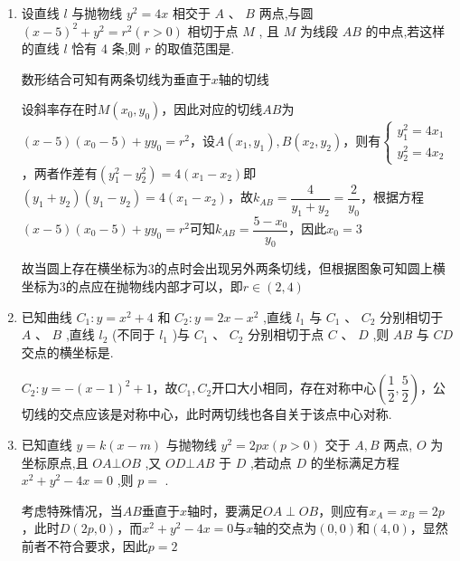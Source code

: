\begin{enumerate}
\begin{jieda}
        综上，$k \in [-\sqrt{3}, -1] \cup [1, \sqrt{3}]$，因此$\alpha \in \left[\dfrac{\pi}{4}, \dfrac{\pi}{3}\right] \cup \left[\dfrac{2\pi}{3}, \dfrac{3\pi}{4}\right]$
    \end{jieda}
    
    \item 设直线 $l$ 与抛物线 ${y}^{2} = {4x}$ 相交于 $A\text{ 、 }B$ 两点,与圆 ${\left( x - 5\right) }^{2} + {y}^{2} = {r}^{2}\left( {r > 0}\right)$ 相切于点 $M$ , 且 $M$ 为线段 ${AB}$ 的中点,若这样的直线 $l$ 恰有 4 条,则 $r$ 的取值范围是.
    \begin{jieda}
        数形结合可知有两条切线为垂直于$x$轴的切线

        设斜率存在时$M(x_0, y_0)$，因此对应的切线$AB$为$(x-5)(x_0 - 5)+yy_0 = r^2$，设$A(x_1, y_1), B(x_2, y_2)$，则有$\left\{\begin{array}{l}
             y_1^2 = 4x_1 \\
             y_2^2 = 4x_2
        \end{array}\right.$，两者作差有$(y_1^2 - y_2^2) = 4(x_1-x_2)$即$(y_1+y_2)(y_1 - y_2) = 4(x_1-x_2)$，故$k_{AB} = \dfrac{4}{y_1+y_2} = \dfrac{2}{y_0}$，根据方程$(x-5)(x_0 - 5)+yy_0 = r^2$可知$k_{AB} = \dfrac{5-x_0}{y_0}$，因此$x_0 = 3$

        故当圆上存在横坐标为$3$的点时会出现另外两条切线，但根据图象可知圆上横坐标为$3$的点应在抛物线内部才可以，即$r \in (2, 4)$
    \end{jieda}
    
    \item 已知曲线 ${C}_{1} : y = {x}^{2} + 4$ 和 ${C}_{2} : y = {2x} - {x}^{2}$ ,直线 ${l}_{1}$ 与 ${C}_{1}\text{ 、 }{C}_{2}$ 分别相切于 $A\text{ 、 }B$ ,直线 ${l}_{2}$ (不同于 ${l}_{1}$ )与 ${C}_{1}$ 、 ${C}_{2}$ 分别相切于点 $C$ 、 $D$ ,则 ${AB}$ 与 ${CD}$ 交点的横坐标是.
    \begin{jieda}
        $C_2: y = -(x-1)^2+1$，故$C_1, C_2$开口大小相同，存在对称中心$\left(\dfrac{1}{2}, \dfrac{5}{2}\right)$，公切线的交点应该是对称中心，此时两切线也各自关于该点中心对称.
    \end{jieda}
    
    \item 已知直线 $y = k\left( {x - m}\right)$ 与抛物线 ${y}^{2} = {2px}\left( {p > 0}\right)$ 交于 $A,B$ 两点, $O$ 为坐标原点,且 ${OA} \bot  {OB}$ ,又 ${OD} \bot  {AB}$ 于 $D$ ,若动点 $D$ 的坐标满足方程 ${x}^{2} + {y}^{2} - {4x} = 0$ ,则 $p = $ .
    \begin{jieda}
        考虑特殊情况，当$AB$垂直于$x$轴时，要满足$OA \perp OB$，则应有$x_A = x_B = 2p$，此时$D(2p, 0)$，而${x}^{2} + {y}^{2} - {4x} = 0$与$x$轴的交点为$(0, 0)$和$(4,0)$，显然前者不符合要求，因此$p = 2$


\end{jieda}
\end{enumerate}
